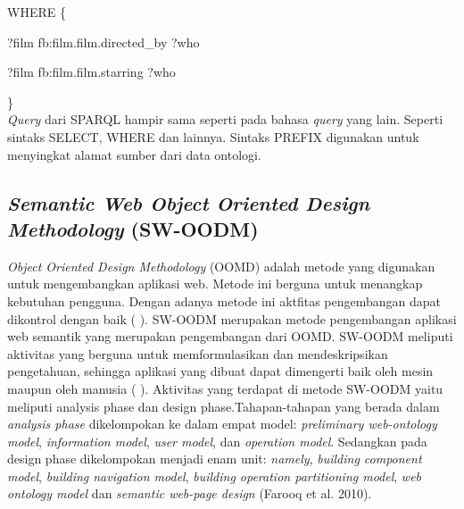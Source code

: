WHERE \{

?film fb:film.film.directed\_by ?who

?film fb:film.film.starring ?who

\}
\\

\textit{Query} dari SPARQL hampir sama seperti pada bahasa \textit{query} yang lain. Seperti sintaks SELECT, WHERE dan lainnya. Sintaks PREFIX digunakan untuk menyingkat alamat sumber dari data ontologi.

\subsection*{\textit{Semantic Web Object Oriented Design Methodology} (SW-OODM)}

\textit{Object Oriented Design Methodology} (OOMD) adalah metode yang digunakan untuk mengembangkan aplikasi web. Metode ini berguna untuk menangkap kebutuhan pengguna. Dengan adanya metode ini aktfitas pengembangan dapat dikontrol dengan baik (\citeauthor{FAROOQA2010} \cite*{FAROOQA2010}). SW-OODM merupakan metode pengembangan aplikasi web semantik yang merupakan pengembangan dari OOMD. SW-OODM meliputi aktivitas yang berguna untuk memformulasikan dan mendeskripsikan pengetahuan, sehingga aplikasi yang dibuat dapat dimengerti baik oleh mesin maupun oleh manusia (\citeauthor{FAROOQA2010} \cite*{FAROOQA2010}). Aktivitas yang terdapat di metode SW-OODM yaitu meliputi analysis phase dan design phase.Tahapan-tahapan yang berada dalam \textit{analysis phase} dikelompokan ke dalam empat model: \textit{preliminary web-ontology model}, \textit{information model}, \textit{user model}, dan \textit{operation model}. Sedangkan pada design phase dikelompokan menjadi enam unit: \textit{namely}, \textit{building component model}, \textit{building navigation model}, \textit{building operation partitioning model}, \textit{web ontology model} dan \textit{semantic web-page design} (Farooq et al. 2010).

